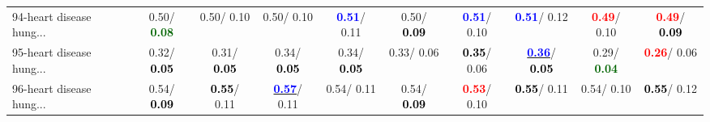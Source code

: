 \begin{table}[h]
\begin{center}
{\begin{tabular}{lc|c|c|c|c|c|c|c|c}
94-heart disease hung... &   0.50/\textcolor{darkgreen}{\textbf{  0.08}} &   0.50/  0.10 &   0.50/  0.10 & \textcolor{blue}{\textbf{  0.51}}/  0.11 &   0.50/\textcolor{black}{\textbf{  0.09}} & \textcolor{blue}{\textbf{  0.51}}/  0.10 & \textcolor{blue}{\textbf{  0.51}}/  0.12 & \textcolor{red}{\textbf{  0.49}}/  0.10 & \textcolor{red}{\textbf{  0.49}}/\textcolor{black}{\textbf{  0.09}} \\
95-heart disease hung... &   0.32/\textcolor{black}{\textbf{  0.05}} &   0.31/\textcolor{black}{\textbf{  0.05}} &   0.34/\textcolor{black}{\textbf{  0.05}} &   0.34/\textcolor{black}{\textbf{  0.05}} &   0.33/  0.06 & \textcolor{black}{\textbf{  0.35}}/  0.06 & \underline{\textcolor{blue}{\textbf{  0.36}}}/\textcolor{black}{\textbf{  0.05}} &   0.29/\textcolor{darkgreen}{\textbf{  0.04}} & \textcolor{red}{\textbf{  0.26}}/  0.06 \\
96-heart disease hung... &   0.54/\textcolor{black}{\textbf{  0.09}} & \textcolor{black}{\textbf{  0.55}}/  0.11 & \underline{\textcolor{blue}{\textbf{  0.57}}}/  0.11 &   0.54/  0.11 &   0.54/\textcolor{black}{\textbf{  0.09}} & \textcolor{red}{\textbf{  0.53}}/  0.10 & \textcolor{black}{\textbf{  0.55}}/  0.11 &   0.54/  0.10 & \textcolor{black}{\textbf{  0.55}}/  0.12 \\\end{tabular}}\label{stratsALCKappa2AllReduxalla}
\end{center}
\end{table}
